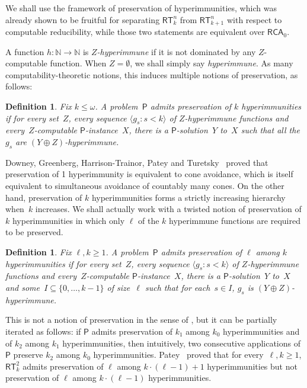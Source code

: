 \documentclass{article}
\newcommand{\Psf}{\mathsf{P}}
\newcommand{\RCA}[0]{\mathsf{RCA}}
\newcommand{\RT}[0]{\mathsf{RT}}
\newcommand{\NN}[0]{\mathbb{N}}
\numberwithin{theorem}{section}
\newtheorem{definition}[theorem]{Definition}
\begin{document}
We shall use the framework of preservation of hyperimmunities, which was already shown to be fruitful for separating $\RT^n_k$ from $\RT^n_{k+1}$ with respect to computable reducibility, while those two statements are equivalent over $\RCA_0$.

A function $h : \NN \to \NN$ is \emph{$Z$-hyperimmune} if it is not dominated by any $Z$-computable function. When $Z = \emptyset$, we shall simply say \emph{hyperimmune}. As many computability-theoretic notions, this induces multiple notions of preservation, as follows:

\begin{definition}Fix $k \leq \omega$.
A problem~$\Psf$ admits \emph{preservation of $k$ hyperimmunities} if for every set~$Z$,
every sequence $\langle g_s : s < k \rangle$ of $Z$-hyperimmune functions and every~$Z$-computable $\Psf$-instance~$X$, there is a $\Psf$-solution~$Y$ to~$X$ such that all the $g_s$ are $(Y \oplus Z)$-hyperimmune.
\end{definition}

Downey, Greenberg, Harrison-Trainor, Patey and Turetsky~\cite{downey_relationships_2022} proved that preservation of 1 hyperimmunity is equivalent to cone avoidance, which is itself equivalent to simultaneous avoidance of countably many cones. On the other hand, preservation of $k$ hyperimmunities forms a strictly increasing hierarchy when~$k$ increases. We shall actually work with a twisted notion of preservation of $k$ hyperimmunities in which only $\ell$ of the $k$ hyperimmune functions are required to be preserved. 

\begin{definition}Fix $\ell, k \geq 1$.
A problem~$\Psf$ admits \emph{preservation of $\ell$ among $k$ hyperimmunities} if for every set~$Z$,
every sequence $\langle g_s : s < k \rangle$ of $Z$-hyperimmune functions and every~$Z$-computable $\Psf$-instance~$X$,
there is a $\Psf$-solution~$Y$ to~$X$ and some~$I \subseteq \{0, \dots, k-1\}$ of size~$\ell$ such that for each~$s \in I$, $g_s$ is $(Y \oplus Z)$-hyperimmune.
\end{definition}

This is not a notion of preservation in the sense of , but it can be partially iterated as follows: if $\Psf$ admits preservation of $k_1$ among $k_0$ hyperimmunities and of $k_2$ among $k_1$ hyperimmunities, then intuitively, two consecutive applications of $\Psf$ preserve $k_2$ among $k_0$ hyperimmunities.
Patey~\cite{patey2016reverse} proved that for every~$\ell, k \geq 1$, $\RT^2_k$ admits preservation of $\ell$ among $k\cdot (\ell-1)+1$ hyperimmunities but not preservation of $\ell$ among $k \cdot (\ell-1)$ hyperimmunities.
\end{document}
